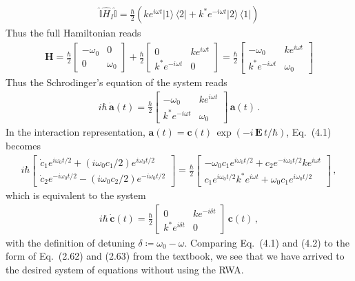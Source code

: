 \documentclass[11pt, oneside]{book}
\theoremstyle{break}
\theoremstyle{break}
\newcommand{\bmat}[1]{\begin{bmatrix} #1 \end{bmatrix}}
\begin{document}
\begin{align*}
\hat{\mathbb{I}}\hat{H}_I \hat{\mathbb{I}}
= \frac{\hbar}{2}
\left( ke^{{i \omega t}} |1\rangle\, \langle 2|+ k^*e^{-i\omega t}|2\rangle \, \langle 1|\right)
\end{align*}
Thus the full Hamiltonian reads
\begin{align*}
\mathbf{H} = \frac{\hbar}{2}\bmat{-\omega_0 & 0 \\ 0 & \omega_0} + \frac{\hbar}{2}
\bmat{0 & ke^{i\omega t}\\ k^* e^{-i \omega t} & 0} = \frac{\hbar}{2} \bmat{-\omega_0 & ke^{i\omega t} \\ k^* e^{-i\omega t} & \omega_0}
\end{align*}
Thus the Schrodinger's equation of the system reads
\begin{align}
i\hbar\, \dot{\mathbf{a}}(t) =  \frac{\hbar}{2} \bmat{-\omega_0 & ke^{i\omega t} \\ k^* e^{-i\omega t} & \omega_0}\,\mathbf{a}(t)\,.
\end{align}
In the interaction representation, $\mathbf{a}(t) = \mathbf{c}(t) \, \exp(-i\, \mathbf{E}\,t/\hbar)$, Eq.\ (4.1) becomes
\begin{align*}
i\hbar \bmat{\dot{c}_1 e^{i\omega_0 t/2} + (i\omega_0 c_1/2) e^{i \omega_0 t/2}\\
\dot{c}_2 e^{-i\omega_0 t/2} - (i\omega_0 c_2/2) e^{-i \omega_0 t/2}
}=\frac{\hbar}{2}
\bmat{-\omega_0 c_1 e^{i\omega_0 t/2} + c_2 e^{-i\omega_0 t/2} k e^{i\omega t}\\
c_1 e^{i\omega_0 t/2}k^* e^{i\omega t} + \omega_0 c_1 e^{i\omega_0 t/2}}\,,
\end{align*}
which is equivalent to the system
\begin{align}
i\hbar\, \dot{\mathbf{c}}(t) = \frac{\hbar}{2}\bmat{0 & k e^{-i\delta t} \\ k^*e^{i\delta t} & 0}\, \mathbf{c}(t)\,,
\end{align}
with the definition of detuning $\delta\coloneqq \omega_0 - \omega$. 
Comparing Eq.\ (4.1) and (4.2) to the form of Eq.\ (2.62) and (2.63) from the textbook, we see that we have arrived to the desired system of equations without using the RWA. \\
\end{document}
